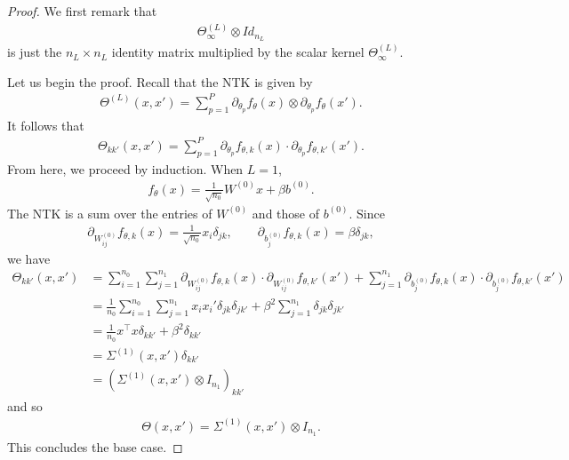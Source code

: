 \documentclass[10pt]{article}
\newcommand{\paran}[1]{{( #1 )}}
\begin{document}
\begin{proof}
We first remark that
\begin{align*}
\Theta^\paran{L}_\infty \otimes Id_{n_L}
\end{align*}
is just the $n_L \times n_L$ identity matrix multiplied by the scalar kernel $\Theta^\paran{L}_\infty$.

Let us begin the proof. Recall that the NTK is given by
\begin{align*}
\Theta^\paran{L}(x,x') = \sum_{p = 1}^P \partial_{\theta_p} f_\theta(x) \otimes \partial_{\theta_p} f_\theta(x').
\end{align*}
It follows that
\begin{align*}
\Theta_{kk'}(x,x') = \sum_{p = 1}^P \partial_{\theta_p} f_{\theta,k}(x) \cdot \partial_{\theta_p} f_{\theta,k'}(x').
\end{align*}
From here, we proceed by induction. When $L = 1$,
\begin{align*}
f_\theta(x) = \frac{1}{\sqrt{n_0}} W^\paran{0} x + \beta b^\paran{0}.
\end{align*}
The NTK is a sum over the entries of $W^\paran{0}$ and those of $b^\paran{0}$. Since
\begin{align*}
\partial_{W^\paran{0}_{ij}} f_{\theta,k}(x) = \frac{1}{\sqrt{n_0}} x_i \delta_{jk}, \qquad \partial_{b^\paran{0}_j} f_{\theta,k}(x) = \beta \delta_{jk},
\end{align*}
we have
\begin{align*}
\Theta_{kk'}(x,x') &= \sum_{i = 1}^{n_0} \sum_{j = 1}^{n_1} \partial_{W^\paran{0}_{ij}} f_{\theta,k}(x) \cdot \partial_{W^\paran{0}_{ij}} f_{\theta,k'}(x') + \sum_{j = 1}^{n_1} \partial_{b^\paran{0}_j} f_{\theta,k}(x) \cdot \partial_{b^\paran{0}_j} f_{\theta,k'}(x') \\
&= \frac{1}{n_0} \sum_{i = 1}^{n_0} \sum_{j = 1}^{n_1} x_i x_i' \delta_{jk} \delta_{jk'} + \beta^2 \sum_{j = 1}^{n_1} \delta_{jk} \delta_{jk'} \\
&= \frac{1}{n_0} x^\top x \delta_{kk'} + \beta^2 \delta_{kk'} \\
&= \Sigma^\paran{1}(x,x') \delta_{kk'} \\
&= (\Sigma^\paran{1}(x,x') \otimes I_{n_1})_{kk'}
\end{align*}
and so
\begin{align*}
\Theta(x,x') = \Sigma^\paran{1}(x,x') \otimes I_{n_1}.
\end{align*}
This concludes the base case.


\end{proof}
\end{document}
